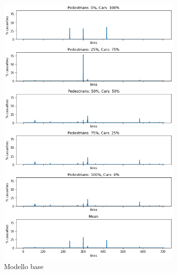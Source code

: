 \begin{figure}[ht]
    \centering
    \begin{subfigure}{0.45\textwidth}
        \centering
        \includegraphics[width=\textwidth]{images/analisi/base_links_casualties}
        \caption{Modello base}
        \label{fig:base-link-casualties}
    \end{subfigure}
    \hfill
    \begin{subfigure}{0.45\textwidth}
        \centering

\end{subfigure}
\end{figure}
